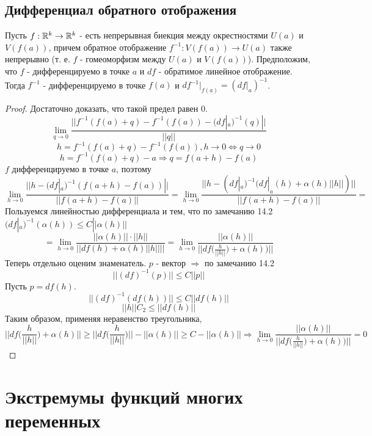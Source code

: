     \section{Дифференциал обратного отображения}
    
    \begin{theorem}
    	Пусть $f : \mathbb R^k \rightarrow \mathbb R^k$ - есть непрерывная биекция между окрестностями $U(a)$ и $V(f(a))$, причем обратное отображение $f^{-1} : V (f(a)) \rightarrow U(a)$ также непрерывно (т. е. $f$ -	гомеоморфизм между $U(a)$ и $V(f(a))$). Предположим, что $f$ - дифференцируемо в точке $a$ и $df$ - обратимое линейное
    	отображение. Тогда $f^{-1}$ - дифференцируемо в точке $f(a)$ и $df^{-1}|_{f(a)}	= (df|_a)^{-1}$.
    \end{theorem}
    
    \begin{proof}
    	Достаточно доказать, что такой предел равен 0.
    	\[ \lim_{q \to 0} \frac{||f^{-1}(f(a) + q) - f^{-1}(f(a)) - (df|_a)^{-1}(q)||}{||q||} \]
    	\[ h = f^{-1}(f(a) + q) - f^{-1}(f(a)), h \to 0 \Leftrightarrow q \to 0 \]
    	\[ h = f^{-1}(f(a) + q) - a \Rightarrow q = f(a + h) - f(a) \]
    	$f$ дифференцируемо в точке $a$, поэтому
    	\[ \lim_{h \to 0} \frac{||h - (df|_a)^{-1}(f(a + h) - f(a))||}{||f(a + h) - f(a)||} = \lim_{h \to 0} \frac{||h - (df|_a)^{-1}(df|_a(h) + \alpha(h)||h||)||}{||f(a + h) - f(a)||} = \]
    	Пользуемся линейностью дифференциала и тем, что по замечанию 14.2 $(df|_a)^{-1}(\alpha(h)) \leqslant C||\alpha(h)||$
    	\[ = \lim_{h \to 0} \frac{||\alpha(h)|| \cdot ||h||}{||df(h) + \alpha(h)||h||||} = \lim_{h \to 0} \frac{||\alpha(h)||}{||df\big(\frac{h}{||h||}\big) + \alpha(h))||} \]
    	Теперь отдельно оценим знаменатель. $p$ - вектор $\Rightarrow$ по замечанию 14.2
    	\[ ||(df)^{-1}(p)|| \leqslant C ||p|| \]
    	Пусть $p = df(h)$.
    	\[ ||(df)^{-1}(df(h))|| \leqslant C||df(h)|| \]
    	\[ ||h|| C_2 \leqslant ||df(h)|| \]
    	Таким образом, применяя неравенство треугольника,
    	\[ ||df\bigg(\frac{h}{||h||}\bigg) + \alpha(h)|| \geqslant ||df\bigg(\frac{h}{||h||}\bigg)|| - ||\alpha(h)|| \geqslant C - ||\alpha(h)|| \Rightarrow \lim_{h \to 0} \frac{||\alpha(h)||}{||df\big(\frac{h}{||h||}\big) + \alpha(h))||} = 0 \]
    \end{proof}
    
    \newpage
    
    \chapter{Экстремумы функций многих переменных}
    
